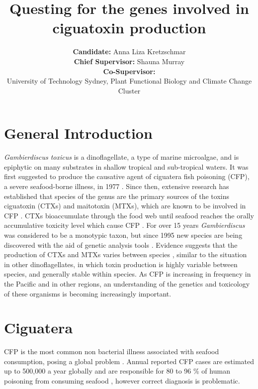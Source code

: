 \documentclass[12pt]{article}
\title{\textbf{Questing for the genes involved in ciguatoxin production}}
\author{\textbf{Candidate:} Anna Liza Kretzschmar\\
 \textbf{Chief Supervisor:} Shauna Murray\\
 \textbf{Co-Supervisor:} \\
 {\small University of Technology Sydney, Plant Functional Biology and Climate Change Cluster}}
\date{}
\begin{document}
\maketitle
\section{General Introduction}
\emph{Gambierdiscus toxicus} is a dinoflagellate, a type of marine microalgae, and is epiphytic on many substrates in shallow tropical and sub-tropical waters. It was first suggested to produce the causative agent of ciguatera fish poisoning (CFP), a severe seafood-borne illness, in 1977 \cite{yasumoto1977finding}.  
Since then, extensive research has established that species of the genus are the primary sources of the toxins ciguatoxin (CTXs) and maitotoxin (MTXs), which are known to be involved in CFP \cite{chinain1997intraspecific,holmes1998gambierdiscus}. CTXs bioaccumulate through the food web until seafood reaches the orally accumulative toxicity level which cause CFP \cite{bagnis1979clinical,gillespie1987possible,sims1987theoretical}. %
For over 15 years \emph{Gambierdiscus} was considered to be a monotypic taxon, but since 1995 new species are being discovered with the aid of genetic analysis tools \cite{faust1995observation,holmes1998gambierdiscus,litaker2009taxonomy,chinain1999morphology,fraga2011gambierdiscus,nishimura2014morphology}. Evidence suggests that the production of CTXs and MTXs varies between species \cite{chinain2010growth,holland2013differences}, similar to the situation in other dinoflagellates, in which toxin production is highly variable between species, and generally stable within species.
As CFP is increasing in frequency in the Pacific \cite{skinner2011ciguatera} and in other regions, an understanding of the genetics and toxicology of these organisms is becoming increasingly important. 

\section{Ciguatera}
CFP is the most common non bacterial illness associated with seafood consumption, posing a global problem \cite{friedman2008ciguatera}. %
Annual reported CFP cases are estimated up to 500,000 a year globally and are responsible for 80 to 96 \% of human poisoning from consuming seafood \cite{fleming1998seafood,grandjean2008centers}, however correct diagnosis is problematic. 
\end{document}
